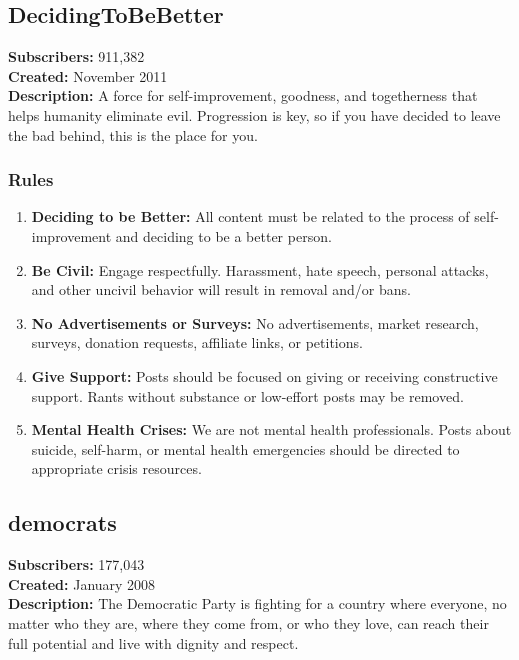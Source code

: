 \subsection{DecidingToBeBetter}
\textbf{Subscribers:} 911,382 \\
\textbf{Created:} November 2011 \\
\textbf{Description:} A force for self-improvement, goodness, and togetherness that helps humanity eliminate evil. Progression is key, so if you have decided to leave the bad behind, this is the place for you.

\subsubsection{Rules}
\begin{enumerate}
    \item \textbf{Deciding to be Better:} All content must be related to the process of self-improvement and deciding to be a better person.
    
    \item \textbf{Be Civil:} Engage respectfully. Harassment, hate speech, personal attacks, and other uncivil behavior will result in removal and/or bans.
    
    \item \textbf{No Advertisements or Surveys:} No advertisements, market research, surveys, donation requests, affiliate links, or petitions.
    
    \item \textbf{Give Support:} Posts should be focused on giving or receiving constructive support. Rants without substance or low-effort posts may be removed.
    
    \item \textbf{Mental Health Crises:} We are not mental health professionals. Posts about suicide, self-harm, or mental health emergencies should be directed to appropriate crisis resources.
\end{enumerate}

\subsection{democrats}
\textbf{Subscribers:} 177,043 \\
\textbf{Created:} January 2008 \\
\textbf{Description:} The Democratic Party is fighting for a country where everyone, no matter who they are, where they come from, or who they love, can reach their full potential and live with dignity and respect.

